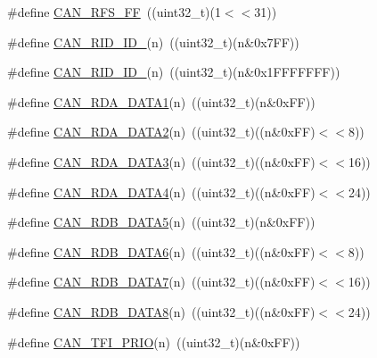 \begin{DoxyCompactItemize}
\item 
\#define \hyperlink{group___c_a_n___private___macros_ga02abf35a3c80ac7be66fa94945d48f56}{\-C\-A\-N\-\_\-\-R\-F\-S\-\_\-\-F\-F}~((uint32\-\_\-t)(1$<$$<$31))
\item 
\#define \hyperlink{group___c_a_n___private___macros_gaaabfc7706456825e5f99e9a14765b86d}{\-C\-A\-N\-\_\-\-R\-I\-D\-\_\-\-I\-D\-\_}(n)~((uint32\-\_\-t)(n\&0x7\-F\-F))
\item 
\#define \hyperlink{group___c_a_n___private___macros_gab542e5da2c707aecd09253a08fde6f99}{\-C\-A\-N\-\_\-\-R\-I\-D\-\_\-\-I\-D\-\_}(n)~((uint32\-\_\-t)(n\&0x1\-F\-F\-F\-F\-F\-F\-F))
\item 
\#define \hyperlink{group___c_a_n___private___macros_gae453276767d4a33c51c10877626dd45f}{\-C\-A\-N\-\_\-\-R\-D\-A\-\_\-\-D\-A\-T\-A1}(n)~((uint32\-\_\-t)(n\&0x\-F\-F))
\item 
\#define \hyperlink{group___c_a_n___private___macros_gac48504929db84afc5645cd31a21c7cc9}{\-C\-A\-N\-\_\-\-R\-D\-A\-\_\-\-D\-A\-T\-A2}(n)~((uint32\-\_\-t)((n\&0x\-F\-F)$<$$<$8))
\item 
\#define \hyperlink{group___c_a_n___private___macros_gac5ad68d250d69c744768a689e15f4244}{\-C\-A\-N\-\_\-\-R\-D\-A\-\_\-\-D\-A\-T\-A3}(n)~((uint32\-\_\-t)((n\&0x\-F\-F)$<$$<$16))
\item 
\#define \hyperlink{group___c_a_n___private___macros_gadba38df46e9872bc8d6bec6d9fab2295}{\-C\-A\-N\-\_\-\-R\-D\-A\-\_\-\-D\-A\-T\-A4}(n)~((uint32\-\_\-t)((n\&0x\-F\-F)$<$$<$24))
\item 
\#define \hyperlink{group___c_a_n___private___macros_gaeae9f4cf2c18d2e3fb5c72bcd0be8c3b}{\-C\-A\-N\-\_\-\-R\-D\-B\-\_\-\-D\-A\-T\-A5}(n)~((uint32\-\_\-t)(n\&0x\-F\-F))
\item 
\#define \hyperlink{group___c_a_n___private___macros_ga2cabd9ee2abe635c633d28ad08540c26}{\-C\-A\-N\-\_\-\-R\-D\-B\-\_\-\-D\-A\-T\-A6}(n)~((uint32\-\_\-t)((n\&0x\-F\-F)$<$$<$8))
\item 
\#define \hyperlink{group___c_a_n___private___macros_gacb3e420f7ca687f1f65e80c6937348dd}{\-C\-A\-N\-\_\-\-R\-D\-B\-\_\-\-D\-A\-T\-A7}(n)~((uint32\-\_\-t)((n\&0x\-F\-F)$<$$<$16))
\item 
\#define \hyperlink{group___c_a_n___private___macros_gaa50cc06cc15ac2178e86d7f49dff72eb}{\-C\-A\-N\-\_\-\-R\-D\-B\-\_\-\-D\-A\-T\-A8}(n)~((uint32\-\_\-t)((n\&0x\-F\-F)$<$$<$24))
\item 
\#define \hyperlink{group___c_a_n___private___macros_gab8d03e1a3f1a9a58ed40cfa8e7f50bed}{\-C\-A\-N\-\_\-\-T\-F\-I\-\_\-\-P\-R\-I\-O}(n)~((uint32\-\_\-t)(n\&0x\-F\-F))
$$
\end{DoxyCompactItemize}
